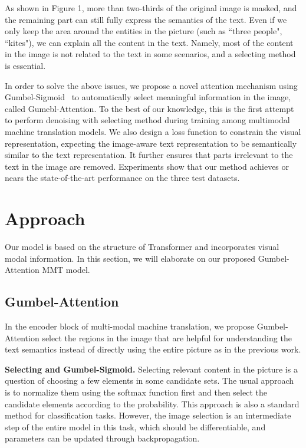 \documentclass[11pt]{article}
\begin{document}
As shown in Figure 1, more than two-thirds of the original image is masked, and the remaining part can still fully express the semantics of the text. Even if we only keep the area around the entities in the picture (such as ``three people", ``kites"), we can explain all the content in the text. 
Namely, most of the content in the image is not related to the text in some scenarios, and a selecting method is essential.

In order to solve the above issues, we propose a novel attention mechanism using  Gumbel-Sigmoid~\citep{DBLP:conf/acl/GengWWQLT20} to automatically select meaningful information in the image, called Gumebl-Attention.
To the best of our knowledge, this is the first attempt to perform denoising with selecting method during training among multimodal machine translation models.
We also design a loss function to constrain the visual representation, expecting the image-aware text representation to be semantically similar to the text representation. It further ensures that parts irrelevant to the text in the image are removed.
Experiments show that our method achieves or nears the state-of-the-art performance on the three test datasets.

\section{Approach}

Our model is based on the structure of Transformer and incorporates visual modal information. 
In this section, we will elaborate on our proposed Gumbel-Attention MMT model.

\subsection{Gumbel-Attention}

In the encoder block of multi-modal machine translation, we propose Gumbel-Attention select the regions in the image that are helpful for understanding the text semantics instead of directly using the entire picture as in the previous work. 

\textbf{Selecting and Gumbel-Sigmoid.} Selecting relevant content in the picture is a question of choosing a few elements in some candidate sets. 
The usual approach is to normalize them using the softmax function first and then select the candidate elements according to the probability. This approach is also a standard method for classification tasks. 
However, the image selection is an intermediate step of the entire model in this task, which should be differentiable, and parameters can be updated through backpropagation.
\end{document}

